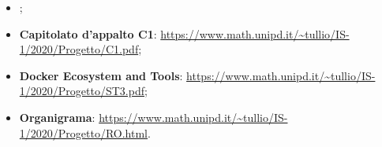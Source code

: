 \begin{itemize}
    \item \NdP{};
    \item \textbf{Capitolato d'appalto C1}: \url{https://www.math.unipd.it/~tullio/IS-1/2020/Progetto/C1.pdf};
    \item \textbf{Docker Ecosystem and Tools}: \url{https://www.math.unipd.it/~tullio/IS-1/2020/Progetto/ST3.pdf};
    \item \textbf{Organigrama}: \url{https://www.math.unipd.it/~tullio/IS-1/2020/Progetto/RO.html}.
\end{itemize}